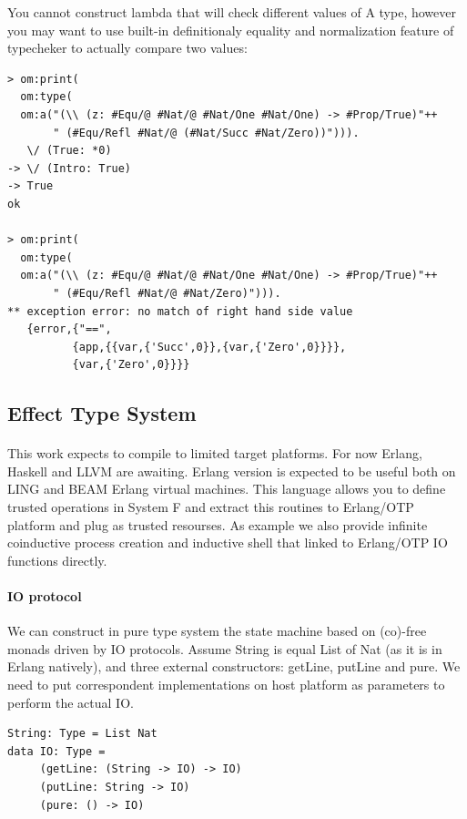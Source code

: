 \documentclass[11pt,oneside]{article}
\begin{document}
You cannot construct lambda that will check different values of A type,
however you may want to use built-in definitionaly equality and
normalization feature of typecheker to actually compare two values:

\begin{lstlisting}[mathescape=true]
> om:print(
  om:type(
  om:a("(\\ (z: #Equ/@ #Nat/@ #Nat/One #Nat/One) -> #Prop/True)"++
       " (#Equ/Refl #Nat/@ (#Nat/Succ #Nat/Zero))"))).
   \/ (True: *0)
-> \/ (Intro: True)
-> True
ok

> om:print(
  om:type(
  om:a("(\\ (z: #Equ/@ #Nat/@ #Nat/One #Nat/One) -> #Prop/True)"++
       " (#Equ/Refl #Nat/@ #Nat/Zero)"))).
** exception error: no match of right hand side value
   {error,{"==",
          {app,{{var,{'Succ',0}},{var,{'Zero',0}}}},
          {var,{'Zero',0}}}}
\end{lstlisting}

\newpage
\subsection{Effect Type System}

\paragraph{}
This work expects to compile to limited target platforms. For now Erlang, Haskell and LLVM are awaiting.
Erlang version is expected to be useful both on LING and BEAM Erlang virtual machines. This language
allows you to define trusted operations in System F and extract this routines to Erlang/OTP platform
and plug as trusted resourses. As example we also provide infinite coinductive process creation
and inductive shell that linked to Erlang/OTP IO functions directly.

\paragraph{IO protocol}
We can construct in pure type system the state machine based on (co)-free
monads driven by IO protocols. Assume String is equal List of Nat (as it is in Erlang natively),
and three external constructors: getLine, putLine and pure. We need to
put correspondent implementations on host platform as parameters to perform the actual IO.

\begin{lstlisting}[mathescape=true]
String: Type = List Nat
data IO: Type =
     (getLine: (String -> IO) -> IO)
     (putLine: String -> IO)
     (pure: () -> IO)
\end{lstlisting}
\end{document}
